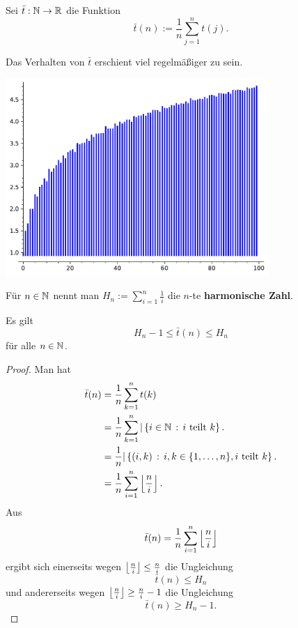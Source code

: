 \begin{defn}
	Sei $\bar{t} : \mathbb{N} \to \mathbb{R}$ die Funktion
	\[
			\bar{t} (n) := \frac{1}{n} \sum_{j=1}^n t(j).
	\]
\end{defn} 

\begin{bem}
	Das Verhalten von $\bar{t}$ erschient viel regelmäßiger zu sein. 
	\begin{center}
	\includegraphics[width=10cm]{Pics/t_bar_plot.pdf}
\end{center} 
\end{bem} 

\begin{defn}
	Für $n \in \mathbb{N}$ nennt man $H_n := \sum_{i=1}^n \frac{1}{i}$ die $n$-te \textbf{harmonische Zahl}. 
\end{defn} 

\begin{thm}
	Es gilt
	\[
		 H_n - 1 \le \bar{t}(n) \le H_n 
	\]
	für alle $n \in \mathbb{N}$. 
\end{thm} 
\begin{proof}
	Man hat 
	\begin{align*} 
		\bar{t} (n) & = \frac{1}{n} \sum_{k=1}^n t(k) 
		\\ & = \frac{1}{n} \sum_{k=1}^n | \setcond{i \in \N}{i \ \text{teilt} \ k}. 
		\\ & = \frac{1}{n} | \setcond{(i,k)}{i,k \in \{1,\ldots,n\}, i \ \text{teilt}  \ k}. 
		\\ & = \frac{1}{n} \sum_{i=1}^n \floor{ \frac{n}{i}}. 
	\end{align*}  
	Aus 
	\[
			\bar{t} (n) = \frac{1}{n} \sum_{i=1}^n \left\lfloor  \frac{n}{i} \right\rfloor
	\]
	ergibt sich einerseits wegen $\left\lfloor  \frac{n}{i} \right\rfloor \le \frac{n}{i}$ die Ungleichung 
	\[
			\bar{t}(n) \le H_n
	\]
	und andererseits wegen $\left\lfloor  \frac{n}{i}  \right\rfloor \ge \frac{n}{i} - 1$ die Ungleichung 
	\[
			\bar{t}(n) \ge H_n -1. 
	\]
\end{proof} 

